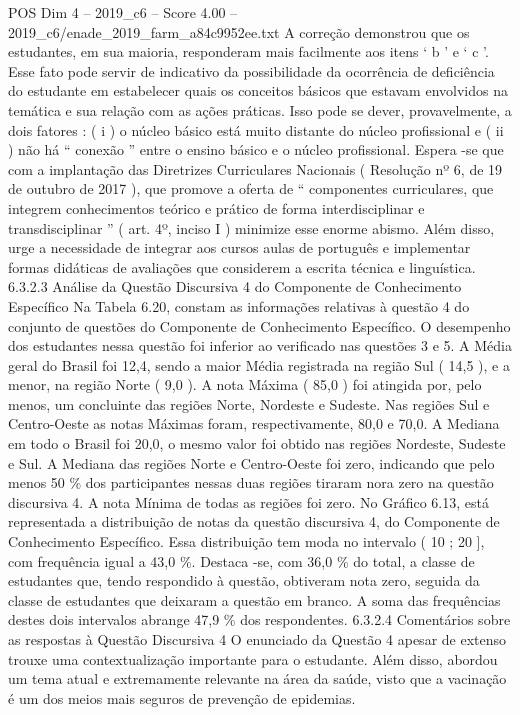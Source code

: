 \begin{textsample}{POS Dim 4 – 2019\_c6 – Score 4.00 – 2019\_c6/enade\_2019\_farm\_a84c9952ee.txt}
A correção demonstrou que os estudantes, em sua maioria, responderam mais facilmente aos itens ‘ b ’ e ‘ c ’.
Esse fato pode servir de indicativo da possibilidade da ocorrência de deficiência do estudante em estabelecer quais os conceitos básicos que estavam envolvidos na temática e sua relação com as ações práticas.
Isso pode se dever, provavelmente, a dois fatores : ( i ) o núcleo básico está muito distante do núcleo profissional e ( ii ) não há “ conexão ” entre o ensino básico e o núcleo profissional.
Espera -se que com a implantação das Diretrizes Curriculares Nacionais ( Resolução nº 6, de 19 de outubro de 2017 ), que promove a oferta de “ componentes curriculares, que integrem conhecimentos teórico e prático de forma interdisciplinar e transdisciplinar ” ( art. 4º, inciso I ) minimize esse enorme abismo.
Além disso, urge a necessidade de integrar aos cursos aulas de português e implementar formas didáticas de avaliações que considerem a escrita técnica e linguística. 6.3.2.3 Análise da Questão Discursiva 4 do Componente de Conhecimento Específico Na Tabela 6.20, constam as informações relativas à questão 4 do conjunto de questões do Componente de Conhecimento Específico.
O desempenho dos estudantes nessa questão foi inferior ao verificado nas questões 3 e 5.
A Média geral do Brasil foi 12,4, sendo a maior Média registrada na região Sul ( 14,5 ), e a menor, na região Norte ( 9,0 ).
A nota Máxima ( 85,0 ) foi atingida por, pelo menos, um concluinte das regiões Norte, Nordeste e Sudeste.
Nas regiões Sul e Centro-Oeste as notas Máximas foram, respectivamente, 80,0 e 70,0.
A Mediana em todo o Brasil foi 20,0, o mesmo valor foi obtido nas regiões Nordeste, Sudeste e Sul.
A Mediana das regiões Norte e Centro-Oeste foi zero, indicando que pelo menos 50 \% dos participantes nessas duas regiões tiraram nora zero na questão discursiva 4.
A nota Mínima de todas as regiões foi zero.
No Gráfico 6.13, está representada a distribuição de notas da questão discursiva 4, do Componente de Conhecimento Específico.
Essa distribuição tem moda no intervalo ( 10 ; 20 ], com frequência igual a 43,0 \%.
Destaca -se, com 36,0 \% do total, a classe de estudantes que, tendo respondido à questão, obtiveram nota zero, seguida da classe de estudantes que deixaram a questão em branco.
A soma das frequências destes dois intervalos abrange 47,9 \% dos respondentes. 6.3.2.4 Comentários sobre as respostas à Questão Discursiva 4 O enunciado da Questão 4 apesar de extenso trouxe uma contextualização importante para o estudante.
Além disso, abordou um tema atual e extremamente relevante na área da saúde, visto que a vacinação é um dos meios mais seguros de prevenção de epidemias.

\end{textsample}

